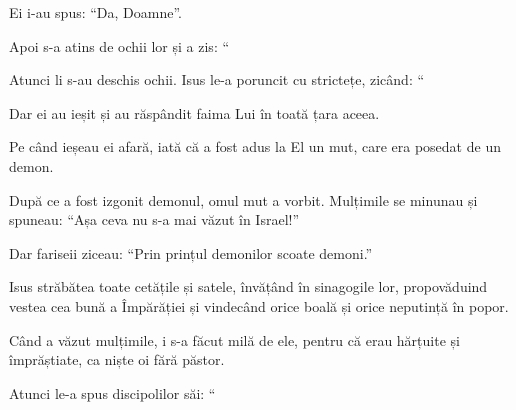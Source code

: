 {\par }{\PP Ei i-au spus: “Da, Doamne”.


\par }{\PP {}Apoi s-a atins de ochii lor și a zis: “{}

Atunci li s-au deschis ochii. Isus le-a poruncit cu strictețe, zicând: “{}

Dar ei au ieșit și au răspândit faima Lui în toată țara aceea.


\par }{\PP {}Pe când ieșeau ei afară, iată că a fost adus la El un mut, care era posedat de un demon.

După ce a fost izgonit demonul, omul mut a vorbit. Mulțimile se minunau și spuneau: “Așa ceva nu s-a mai văzut în Israel!”


\par }{\PP {}Dar fariseii ziceau: “Prin prințul demonilor scoate demoni.”


\par }{\PP {}Isus străbătea toate cetățile și satele, învățând în sinagogile lor, propovăduind vestea cea bună a Împărăției și vindecând orice boală și orice neputință în popor.

Când a văzut mulțimile, i s-a făcut milă de ele, pentru că erau hărțuite și împrăștiate, ca niște oi fără păstor.

Atunci le-a spus discipolilor săi: “{}




\par }
